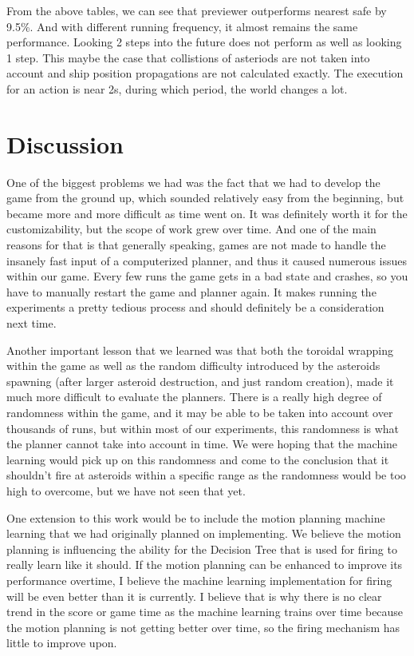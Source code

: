 \documentclass[10pt,final,conference]{IEEEtran}
\begin{document}
From the above tables, we can see that previewer outperforms nearest safe by 9.5\%. And with different running frequency, it almost remains the same performance. Looking 2 steps into the future does not perform as well as looking 1 step. This maybe the case that collistions of asteriods are not taken into account and ship position propagations are not calculated exactly. The execution for an action is near 2s, during which period, the world changes a lot. 

\section{Discussion}

One of the biggest problems we had was the fact that we had to develop the game from the ground up, which sounded relatively easy from the beginning, but became more and more difficult as time went on.  It was definitely worth it for the customizability, but the scope of work grew over time.  And one of the main reasons for that is that generally speaking, games are not made to handle the insanely fast input of a computerized planner, and thus it caused numerous issues within our game.  Every few runs the game gets in a bad state and crashes, so you have to manually restart the game and planner again.  It makes running the experiments a pretty tedious process and should definitely be a consideration next time.

Another important lesson that we learned was that both the toroidal wrapping within the game as well as the random difficulty introduced by the asteroids spawning (after larger asteroid destruction, and just random creation), made it much more difficult to evaluate the planners.  There is a really high degree of randomness within the game, and it may be able to be taken into account over thousands of runs, but within most of our experiments, this randomness is what the planner cannot take into account in time.  We were hoping that the machine learning would pick up on this randomness and come to the conclusion that it shouldn't fire at asteroids within a specific range as the randomness would be too high to overcome, but we have not seen that yet.

One extension to this work would be to include the motion planning machine learning that we had originally planned on implementing.  We believe the motion planning is influencing the ability for the Decision Tree that is used for firing to really learn like it should.  If the motion planning can be enhanced to improve its performance overtime, I believe the machine learning implementation for firing will be even better than it is currently.  I believe that is why there is no clear trend in the score or game time as the machine learning trains over time because the motion planning is not getting better over time, so the firing mechanism has little to improve upon.



\end{document}
